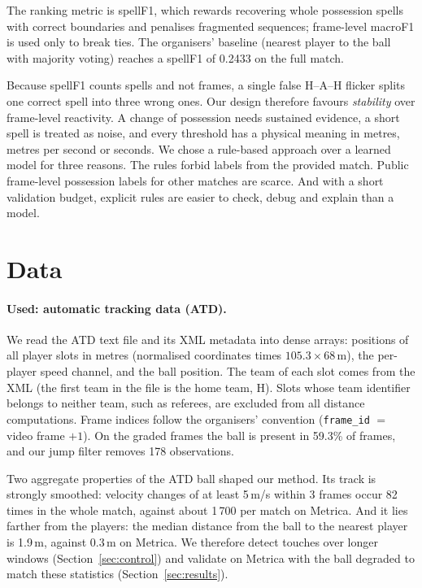 \documentclass[11pt,a4paper]{article}
\newcommand{\code}[1]{\texttt{#1}}
\begin{document}
The ranking metric is spellF1, which rewards recovering whole possession spells with correct boundaries and penalises
fragmented sequences; frame-level macroF1 is used only to break ties. The organisers' baseline (nearest player to the
ball with majority voting) reaches a spellF1 of 0.2433 on the full match.

Because spellF1 counts spells and not frames, a single false H--A--H flicker splits one correct spell into three wrong
ones. Our design therefore favours \emph{stability} over frame-level reactivity. A change of possession needs sustained
evidence, a short spell is treated as noise, and every threshold has a physical meaning in metres, metres per second
or seconds. We chose a rule-based approach over a learned model for three reasons. The rules forbid labels from the
provided match. Public frame-level possession labels for other matches are scarce. And with a short validation
budget, explicit rules are easier to check, debug and explain than a model.

\section{Data}
\label{sec:data}

\paragraph{Used: automatic tracking data (ATD).}
We read the ATD text file and its XML metadata into dense arrays: positions of all player slots in metres (normalised
coordinates times $105.3\times68$\,m), the per-player speed channel, and the ball position. The team of each slot comes
from the XML (the first team in the file is the home team, H). Slots whose team identifier belongs to neither team,
such as referees, are excluded from all distance computations. Frame indices follow the organisers' convention
(\code{frame\_id} $=$ video frame $+1$). On the graded frames the ball is present in 59.3\% of frames, and our jump
filter removes 178 observations.

Two aggregate properties of the ATD ball shaped our method. Its track is strongly smoothed: velocity changes of at
least 5\,m/s within 3 frames occur 82 times in the whole match, against about 1\,700 per match on Metrica. And it lies
farther from the players: the median distance from the ball to the nearest player is 1.9\,m, against 0.3\,m on
Metrica. We therefore detect touches over longer windows (Section~\ref{sec:control}) and validate on Metrica with the
ball degraded to match these statistics (Section~\ref{sec:results}).
\end{document}
